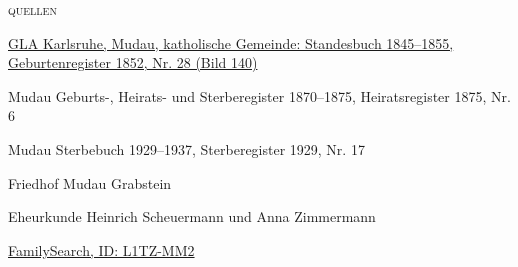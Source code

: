 \begin{person}[
    surname = {Schäfer},
    givenname = {Margareta},
    suffix = {1852--1929},
    label = {@I390@}
    ]
\medbreak
\textsc{{quellen}}
\begin{enumerate}[label={[\arabic*]}]
\item \href{http://www.landesarchiv-bw.de/plink/?f=4-1119480-140}{GLA Karlsruhe, Mudau, katholische Gemeinde: Standesbuch 1845–1855, Geburtenregister 1852, Nr. 28 (Bild 140)}
\item Mudau Geburts-, Heirats- und Sterberegister 1870–1875, Heiratsregister 1875, Nr. 6 
\item Mudau Sterbebuch 1929–1937, Sterberegister 1929, Nr. 17
\item Friedhof Mudau Grabstein
\item Eheurkunde Heinrich Scheuermann und Anna Zimmermann
\item \href{https://www.familysearch.org/tree/person/details/L1TZ-MM2}{FamilySearch, ID: L1TZ-MM2}
\end{enumerate}

\end{person}

